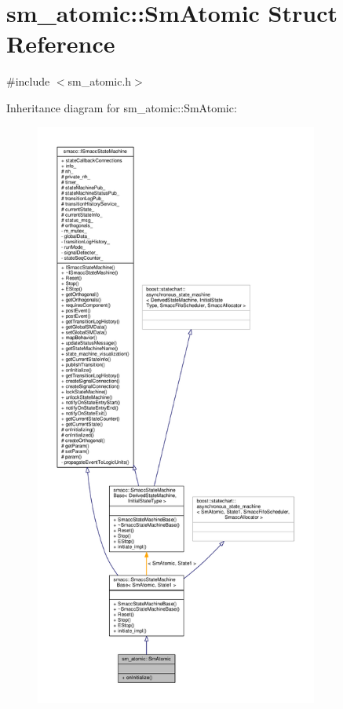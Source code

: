 \hypertarget{structsm__atomic_1_1SmAtomic}{}\section{sm\+\_\+atomic\+:\+:Sm\+Atomic Struct Reference}
\label{structsm__atomic_1_1SmAtomic}


{\ttfamily \#include $<$sm\+\_\+atomic.\+h$>$}



Inheritance diagram for sm\+\_\+atomic\+:\+:Sm\+Atomic\+:\nopagebreak
\begin{figure}[H]
\begin{center}
\leavevmode
\includegraphics[height=550pt]{structsm__atomic_1_1SmAtomic__inherit__graph}
\end{center}
\end{figure}


